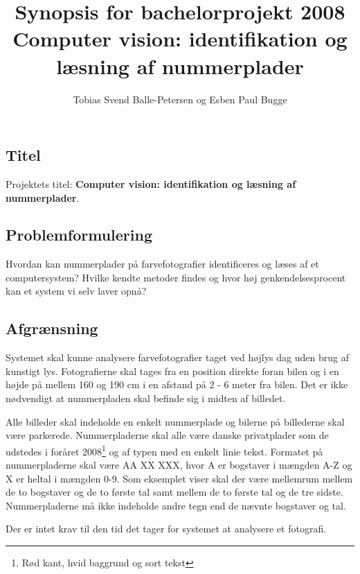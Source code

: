 \documentclass[10pt,a4paper,final]{report}
\author{Tobias Svend Balle-Petersen og Esben Paul Bugge}
\title{Synopsis for bachelorprojekt 2008\\\large{Computer vision: identifikation og læsning af nummerplader}}
\begin{document}
\maketitle

\subsection*{Titel}
Projektets titel: \textbf{Computer vision: identifikation og læsning af nummerplader}.
\subsection*{Problemformulering}
Hvordan kan nummerplader på farvefotografier identificeres og læses af et computersystem? Hvilke kendte metoder findes og hvor høj genkendelsesprocent kan et system vi selv laver opnå?


\subsection*{Afgrænsning}
Systemet skal kunne analysere farvefotografier taget ved højlys dag uden brug af kunstigt lys. Fotografierne skal tages fra en position direkte foran bilen og i en højde på mellem 160 og 190 cm i en afstand på 2 - 6 meter fra bilen. Det er ikke nødvendigt at nummerpladen skal befinde sig i midten af billedet.

Alle billeder skal indeholde en enkelt nummerplade og bilerne på billederne skal være parkerede. Nummerpladerne skal alle være danske privatplader som de udstedes i foråret 2008\footnote{Rød kant, hvid baggrund og sort tekst} og af typen med en enkelt linie tekst. Formatet på nummerpladerne skal være AA XX XXX, hvor A er bogstaver i mængden A-Z og X er heltal i mængden 0-9. Som eksemplet viser skal der være mellemrum mellem de to bogstaver og de to første tal samt mellem de to første tal og de tre sidste. Nummerpladerne må ikke indeholde andre tegn end de nævnte bogstaver og tal.

Der er intet krav til den tid det tager for systemet at analysere et fotografi.




\end{document}
